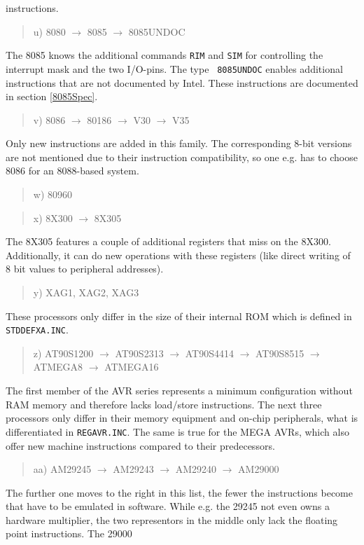 \documentclass[12pt,twoside]{report}
\newcommand{\tty}[1]{{\tt #1}}
\begin{document}
instructions.
\begin{quote}
u) 8080 $\rightarrow$ 8085 $\rightarrow$ 8085UNDOC
\end{quote}
The 8085 knows the additional commands \tty{RIM} and \tty{SIM} for
controlling the interrupt mask and the two I/O-pins.  The type {\tt
8085UNDOC} enables additional instructions that are not documented
by Intel.  These instructions are documented in section \ref{8085Spec}.
\begin{quote}
v) 8086 $\rightarrow$ 80186 $\rightarrow$ V30 $\rightarrow$ V35
\end{quote}
Only new instructions are added in this family.  The corresponding
8-bit versions are not mentioned due to their instruction
compatibility, so one e.g. has to choose 8086 for an 8088-based
system.
\begin{quote}
w) 80960
\end{quote}
\begin{quote}
x) 8X300 $\rightarrow$ 8X305
\end{quote}
The 8X305 features a couple of additional registers that miss on the
8X300.  Additionally, it can do new operations with these registers
(like direct writing of 8 bit values to peripheral addresses).
\begin{quote}
y) XAG1, XAG2, XAG3
\end{quote}
These processors only differ in the size of their internal ROM which
is defined in \tty{STDDEFXA.INC}.
\begin{quote}
z) AT90S1200 $\rightarrow$ AT90S2313 $\rightarrow$ AT90S4414 $\rightarrow$
   AT90S8515 $\rightarrow$ ATMEGA8 $\rightarrow$ ATMEGA16
\end{quote}
The first member of the AVR series represents a minimum configuration
without RAM memory and therefore lacks load/store instructions.  The
next three processors only differ in their memory equipment and
on-chip peripherals, what is differentiated in \tty{REGAVR.INC}.  The same
is true for the MEGA AVRs, which also offer new machine instructions
compared to their predecessors.
\begin{quote}
aa) AM29245 $\rightarrow$ AM29243 $\rightarrow$ AM29240 $\rightarrow$ AM29000
\end{quote}
The further one moves to the right in this list, the fewer the
instructions become that have to be emulated in software.  While e.g.
the 29245 not even owns a hardware multiplier, the two representors in
the middle only lack the floating point instructions.  The 29000
\end{document}
